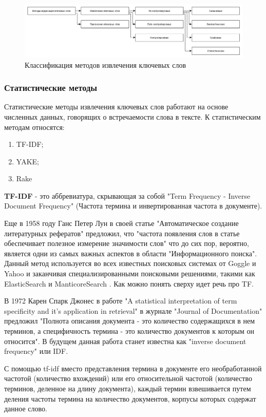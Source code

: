 
\begin{figure}[H]
	\centering
	\includegraphics[width=0.7\linewidth]{src/img/ke_types}
	\caption[]{Классификация методов извлечения ключевых слов}
	\label{fig:ketypes}
\end{figure}

\subsubsection{Статистические методы}
Статистические методы извлечения ключевых слов работают на основе численных данных, говорящих о встречаемости слова в тексте.
К статистическим методам относятся:
\begin{enumerate}
	\item TF-IDF;
	\item YAKE;
	\item Rake
\end{enumerate}

\textbf{TF-IDF} - это аббревиатура, скрывающая за собой "Term Frequency - Inverse Document Frequency" (Частота термина и инвертированная частота в документе).

Еще в 1958 году Ганс Петер Лун в своей статье "Автоматическое создание литературных рефератов" предложил, что "частота появления слов в статье обеспечивает полезное измерение значимости слов" что до сих пор, вероятно, является одни из самых важных аспектов в области "Информационного поиска". 
Данный метод используется во всех известных поисковых системах от Goggle и Yahoo и заканчивая специализированными поисковыми решениями, такими как ElasticSearch и ManticoreSearch \cite{12}.
Как можно понять сверху идет речь про TF.

В 1972 Карен Спарк Джонес в работе "A statistical interpretation of term specificity and it's application in retrieval" в журнале "Journal of Documentation" \cite{11} предложил "Полнота описания документа - это количество содержащихся в нем терминов, а специфичность термина - это количество документов к которым он относится". 
В будущем данная работа станет известна как "inverse document frequency" или IDF.

С помощью tf-idf вместо представления термина в документе его необработанной частотой (количество вхождений) или его относительной частотой (количество терминов, деленное на длину документа), каждый термин взвешивается путем деления частоты термина на количество документов, корпусы которых содержат данное слово.

